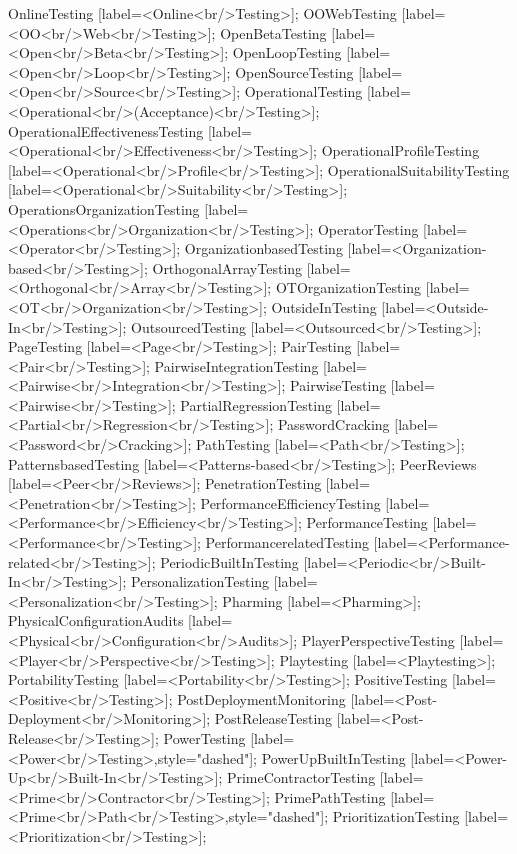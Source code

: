 \documentclass{article}
\begin{document}
{OnlineTesting [label=<Online<br/>Testing>];
OOWebTesting [label=<OO<br/>Web<br/>Testing>];
OpenBetaTesting [label=<Open<br/>Beta<br/>Testing>];
OpenLoopTesting [label=<Open<br/>Loop<br/>Testing>];
OpenSourceTesting [label=<Open<br/>Source<br/>Testing>];
OperationalTesting [label=<Operational<br/>(Acceptance)<br/>Testing>];
OperationalEffectivenessTesting [label=<Operational<br/>Effectiveness<br/>Testing>];
OperationalProfileTesting [label=<Operational<br/>Profile<br/>Testing>];
OperationalSuitabilityTesting [label=<Operational<br/>Suitability<br/>Testing>];
OperationsOrganizationTesting [label=<Operations<br/>Organization<br/>Testing>];
OperatorTesting [label=<Operator<br/>Testing>];
OrganizationbasedTesting [label=<Organization-based<br/>Testing>];
OrthogonalArrayTesting [label=<Orthogonal<br/>Array<br/>Testing>];
OTOrganizationTesting [label=<OT<br/>Organization<br/>Testing>];
OutsideInTesting [label=<Outside-In<br/>Testing>];
OutsourcedTesting [label=<Outsourced<br/>Testing>];
PageTesting [label=<Page<br/>Testing>];
PairTesting [label=<Pair<br/>Testing>];
PairwiseIntegrationTesting [label=<Pairwise<br/>Integration<br/>Testing>];
PairwiseTesting [label=<Pairwise<br/>Testing>];
PartialRegressionTesting [label=<Partial<br/>Regression<br/>Testing>];
PasswordCracking [label=<Password<br/>Cracking>];
PathTesting [label=<Path<br/>Testing>];
PatternsbasedTesting [label=<Patterns-based<br/>Testing>];
PeerReviews [label=<Peer<br/>Reviews>];
PenetrationTesting [label=<Penetration<br/>Testing>];
PerformanceEfficiencyTesting [label=<Performance<br/>Efficiency<br/>Testing>];
PerformanceTesting [label=<Performance<br/>Testing>];
PerformancerelatedTesting [label=<Performance-related<br/>Testing>];
PeriodicBuiltInTesting [label=<Periodic<br/>Built-In<br/>Testing>];
PersonalizationTesting [label=<Personalization<br/>Testing>];
Pharming [label=<Pharming>];
PhysicalConfigurationAudits [label=<Physical<br/>Configuration<br/>Audits>];
PlayerPerspectiveTesting [label=<Player<br/>Perspective<br/>Testing>];
Playtesting [label=<Playtesting>];
PortabilityTesting [label=<Portability<br/>Testing>];
PositiveTesting [label=<Positive<br/>Testing>];
PostDeploymentMonitoring [label=<Post-Deployment<br/>Monitoring>];
PostReleaseTesting [label=<Post-Release<br/>Testing>];
PowerTesting [label=<Power<br/>Testing>,style="dashed"];
PowerUpBuiltInTesting [label=<Power-Up<br/>Built-In<br/>Testing>];
PrimeContractorTesting [label=<Prime<br/>Contractor<br/>Testing>];
PrimePathTesting [label=<Prime<br/>Path<br/>Testing>,style="dashed"];
PrioritizationTesting [label=<Prioritization<br/>Testing>];
}
\end{document}
